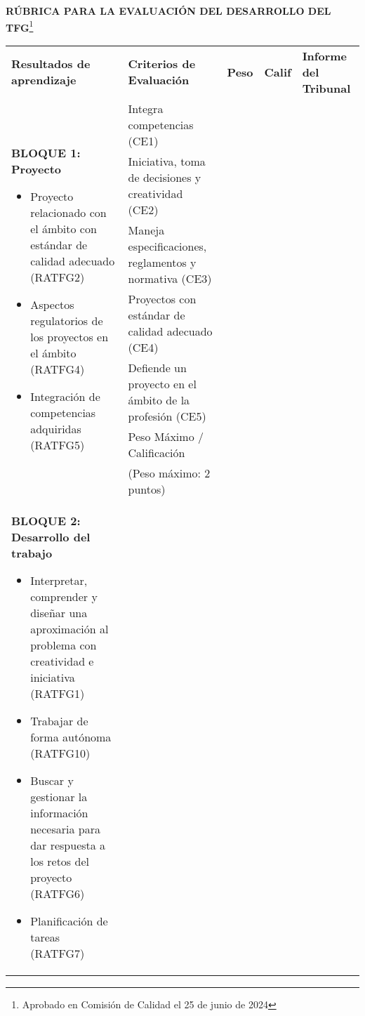 \begin{landscape}
\thispagestyle{plain}
\noindent \textbf{RÚBRICA PARA LA EVALUACIÓN DEL DESARROLLO DEL TFG}\footnote{Aprobado en Comisión de Calidad el 25 de junio de 2024}
\renewcommand{\arraystretch}{1.3} %

\begin{table}[ht]
  \centering
  \small
\begin{tabularx}{\linewidth}{|p{7cm}|p{9cm}|p{1cm}|p{1cm}|p{5cm}|}
\cline{1-5}
\textbf{Resultados de aprendizaje} & \textbf{Criterios de Evaluación} & \textbf{Peso} & \textbf{Calif} & \textbf{Informe del Tribunal} \\ \cline{1-5}
  \multirow{7}{=}{%
  \begin{minipage}[t]{7cm}
    \textbf{BLOQUE 1: Proyecto}
    \begin{itemize}[left=5pt, itemsep=1pt, topsep=1pt]
      \item Proyecto relacionado con el ámbito con estándar de calidad adecuado (RATFG2)
      \item Aspectos regulatorios de los proyectos en el ámbito (RATFG4)
      \item Integración de competencias adquiridas (RATFG5)
    \end{itemize}
  \end{minipage}}
    & Integra competencias (CE1) &  &  & \multirow[t]{7}{=}{} \\ \cline{2-4}
    & Iniciativa, toma de decisiones y creatividad (CE2) &  &  &  \\ \cline{2-4}
    & Maneja especificaciones, reglamentos y normativa (CE3) &  &  &  \\ \cline{2-4}
    & Proyectos con estándar de calidad adecuado (CE4) &  &  &  \\ \cline{2-4}
    & Defiende un proyecto en el ámbito de la profesión (CE5) &  &  &  \\ \cline{2-4}
    & \cellcolor[HTML]{C0C0C0}Peso Máximo / Calificación &  &  &  \\
    & \cellcolor[HTML]{C0C0C0}(Peso máximo: 2 puntos) &  &  &  \\ \cline{1-5}
  \multirow{6}{=}{%
  \begin{minipage}[t]{7cm}
    \vspace{1mm}
    \textbf{BLOQUE 2: Desarrollo del trabajo}
    \begin{itemize}[left=5pt, itemsep=1pt, topsep=1pt]
      \item Interpretar, comprender y diseñar una aproximación al problema con creatividad e iniciativa (RATFG1)
      \item Trabajar de forma autónoma (RATFG10)
      \item Buscar y gestionar la información necesaria para dar respuesta a los retos del proyecto (RATFG6)
      \item Planificación de tareas (RATFG7)
    \end{itemize}
  \end{minipage}}


\end{tabularx}
\end{table}
\end{landscape}
